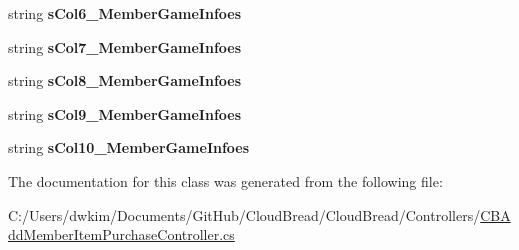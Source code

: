 \begin{DoxyCompactItemize}
\item 
string {\bfseries s\+Col6\+\_\+\+Member\+Game\+Infoes}\hypertarget{class_cloud_bread_1_1_controllers_1_1_c_b_add_member_item_purchase_controller_1_1_input_params_a2531d163ec3219e281c0e7a6b9ddb27d}{}\label{class_cloud_bread_1_1_controllers_1_1_c_b_add_member_item_purchase_controller_1_1_input_params_a2531d163ec3219e281c0e7a6b9ddb27d}

\item 
string {\bfseries s\+Col7\+\_\+\+Member\+Game\+Infoes}\hypertarget{class_cloud_bread_1_1_controllers_1_1_c_b_add_member_item_purchase_controller_1_1_input_params_a56377cc7982e7d62c0d21480a175687b}{}\label{class_cloud_bread_1_1_controllers_1_1_c_b_add_member_item_purchase_controller_1_1_input_params_a56377cc7982e7d62c0d21480a175687b}

\item 
string {\bfseries s\+Col8\+\_\+\+Member\+Game\+Infoes}\hypertarget{class_cloud_bread_1_1_controllers_1_1_c_b_add_member_item_purchase_controller_1_1_input_params_a1b65e916b4788fbfbfc9bbfe2dfe0d5a}{}\label{class_cloud_bread_1_1_controllers_1_1_c_b_add_member_item_purchase_controller_1_1_input_params_a1b65e916b4788fbfbfc9bbfe2dfe0d5a}

\item 
string {\bfseries s\+Col9\+\_\+\+Member\+Game\+Infoes}\hypertarget{class_cloud_bread_1_1_controllers_1_1_c_b_add_member_item_purchase_controller_1_1_input_params_a22c6b265169ae146d387e0e8b307995b}{}\label{class_cloud_bread_1_1_controllers_1_1_c_b_add_member_item_purchase_controller_1_1_input_params_a22c6b265169ae146d387e0e8b307995b}

\item 
string {\bfseries s\+Col10\+\_\+\+Member\+Game\+Infoes}\hypertarget{class_cloud_bread_1_1_controllers_1_1_c_b_add_member_item_purchase_controller_1_1_input_params_a46c582be57c00dff5546a3860411bdcc}{}\label{class_cloud_bread_1_1_controllers_1_1_c_b_add_member_item_purchase_controller_1_1_input_params_a46c582be57c00dff5546a3860411bdcc}

\end{DoxyCompactItemize}


The documentation for this class was generated from the following file\+:\begin{DoxyCompactItemize}
\item 
C\+:/\+Users/dwkim/\+Documents/\+Git\+Hub/\+Cloud\+Bread/\+Cloud\+Bread/\+Controllers/\hyperlink{_c_b_add_member_item_purchase_controller_8cs}{C\+B\+Add\+Member\+Item\+Purchase\+Controller.\+cs}\end{DoxyCompactItemize}
